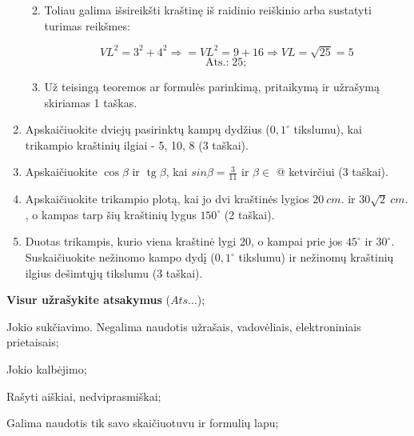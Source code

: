 \documentclass[a4paper]{article}
\makeatletter
\DeclareMathOperator{\tg}{tg}
\newcommand*{\rom}[1]{\expandafter\@slowromancap\romannumeral #1@}
\makeatother
\begin{document}
\begin{enumerate}
\begin{enumerate}
\begin{minipage}{0.5\textwidth}
                        \end{minipage}

                  \item \parbox{0.7\textwidth}{
                              Toliau galima išsireikšti kraštinę iš
                              raidinio reiškinio arba sustatyti turimas
                              reikšmes:
                        }

                        $$VL^{2}=3^{2}+4^{2} \Rightarrow=
                              VL^{2}=9+16 \Rightarrow VL=\sqrt{25}=5$$
                        $$\text{Ats.:} \; 25;$$

                  \item Už teisingą teoremos ar formulės parinkimą,
                        pritaikymą
                        ir užrašymą skiriamas 1 taškas.
            \end{enumerate}

      \item Apskaičiuokite dviejų pasirinktų kampų dydžius ($0,1^\circ$
            tikslumu), kai trikampio kraštinių ilgiai - 5, 10, 8 (3 taškai).

      \item Apskaičiuokite $\cos\beta$ ir $\tg \beta$, kai $sin \beta =
                  \frac{3}{11}$ ir $\beta \in$ \rom{2} ketvirčiui (3 taškai).

      \item Apskaičiuokite trikampio plotą, kai jo dvi kraštinės lygios
            $20\:cm.$ ir $30\sqrt{2}\:cm.$, o kampas tarp šių kraštinių lygus
            $150^\circ$ (2 taškai).

      \item Duotas trikampis, kurio viena kraštinė lygi 20, o kampai prie jos
            $45^\circ$ ir $30^\circ$. Suskaičiuokite nežinomo kampo dydį
            ($0,1^\circ$ tikslumu) ir
            nežinomų kraštinių ilgius dešimtųjų tikslumu (3 taškai).

\end{enumerate}

\begin{small}
      \begin{enumerate*}[label={(\arabic*)}]
            \item \textbf{Visur užrašykite atsakymus} ($Ats\ldots$);
            \item Jokio sukčiavimo. Negalima naudotis užrašais, vadovėliais,
            elektroniniais prietaisais;
            \item Jokio kalbėjimo;
            \item Rašyti aiškiai, nedviprasmiškai;
            \item Galima naudotis tik savo skaičiuotuvu ir formulių lapu;
      \end{enumerate*}
\end{small}
\end{document}
